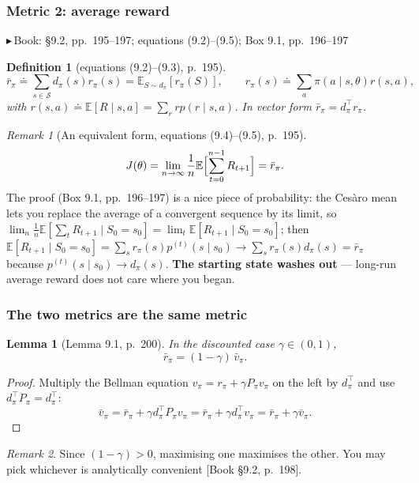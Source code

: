 \documentclass[11pt, letterpaper]{article}
\theoremstyle{runin}
\newtheorem*{definition}{Definition}
\theoremstyle{runinplain}
\newtheorem{lemma}[theorem]{Lemma}
\theoremstyle{remark}
\newtheorem*{remark}{Remark}
\newcommand{\E}{\mathbb{E}}
\newcommand{\Sspace}{\mathcal{S}}
\newcommand{\bk}[1]{{\color{bookblue}\small$\blacktriangleright$\,\textsf{Book: #1}}}
\newcommand{\bkin}[1]{{\color{bookblue}\small[\textsf{Book #1}]}}
\begin{document}
\subsubsection{Metric 2: average reward}

\bk{\S9.2, pp.~195--197; equations (9.2)--(9.5); Box 9.1, pp.~196--197}

\begin{definition}[equations (9.2)--(9.3), p.~195]
\[
  \bar r_\pi\doteq\sum_{s\in\Sspace}d_\pi(s)r_\pi(s)=\E_{S\sim d_\pi}[r_\pi(S)],
  \qquad
  r_\pi(s)\doteq\sum_{a}\pi(a\mid s,\theta)r(s,a),
\]
with $r(s,a)\doteq\E[R\mid s,a]=\sum_r rp(r\mid s,a)$. In vector form
$\bar r_\pi=d_\pi^{\!\top}r_\pi$.
\end{definition}

\begin{remark}[An equivalent form, equations (9.4)--(9.5), p.~195]
\[
  J(\theta)=\lim_{n\to\infty}\frac1n\E\Bigl[\sum_{t=0}^{n-1}R_{t+1}\Bigr]=\bar r_\pi .
\]
The proof (Box 9.1, pp.~196--197) is a nice piece of probability: the Ces\`aro mean
lets you replace the average of a convergent sequence by its limit, so
$\lim_n\frac1n\E[\sum_tR_{t+1}\mid S_0=s_0]=\lim_t\E[R_{t+1}\mid S_0=s_0]$; then
$\E[R_{t+1}\mid S_0=s_0]=\sum_s r_\pi(s)p^{(t)}(s\mid s_0)\to\sum_s r_\pi(s)d_\pi(s)=\bar r_\pi$
because $p^{(t)}(s\mid s_0)\to d_\pi(s)$. \textbf{The starting state washes out} ---
long-run average reward does not care where you began.
\end{remark}

\subsubsection{The two metrics are the same metric}

\begin{lemma}[Lemma 9.1, p.~200]
In the discounted case $\gamma\in(0,1)$,
\[
  \boxed{\;\bar r_\pi=(1-\gamma)\,\bar v_\pi.\;}
\]
\end{lemma}

\begin{proof}
Multiply the Bellman equation $v_\pi=r_\pi+\gamma P_\pi v_\pi$ on the left by
$d_\pi^{\!\top}$ and use $d_\pi^{\!\top}P_\pi=d_\pi^{\!\top}$:
\[
  \bar v_\pi=\bar r_\pi+\gamma d_\pi^{\!\top}P_\pi v_\pi=\bar r_\pi+\gamma d_\pi^{\!\top}v_\pi
  =\bar r_\pi+\gamma\bar v_\pi .
\]
\end{proof}

\begin{remark}
Since $(1-\gamma)>0$, maximising one maximises the other. You may pick whichever is
analytically convenient \bkin{\S9.2, p.~198}.
\end{remark}
\end{document}
